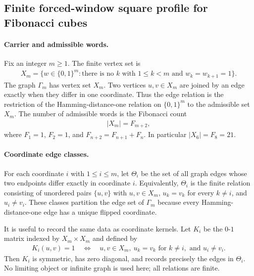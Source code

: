 
\subsection{Finite forced-window square profile for Fibonacci cubes}
\label{sec:window-fibonacci-cube-theta-square-factorization}

\paragraph{Carrier and admissible words.}
Fix an integer $m \geq 1$. The finite vertex set is
$$
\begin{aligned}
X_m=\{w\in \{0,1\}^m : \text{there is no }k\text{ with }1\leq k<m\text{ and }w_k=w_{k+1}=1\}.
\end{aligned}
$$
The graph $\Gamma_m$ has vertex set $X_m$. Two vertices $u,v\in X_m$ are joined by an edge exactly when they differ in one coordinate. Thus the edge relation is the restriction of the Hamming-distance-one relation on $\{0,1\}^m$ to the admissible set $X_m$. The number of admissible words is the Fibonacci count
$$
\begin{aligned}
|X_m|=F_{m+2},
\end{aligned}
$$
where $F_1=1$, $F_2=1$, and $F_{n+2}=F_{n+1}+F_n$. In particular $|X_6|=F_8=21$.

\paragraph{Coordinate edge classes.}
For each coordinate $i$ with $1\leq i\leq m$, let $\Theta_i$ be the set of all graph edges whose two endpoints differ exactly in coordinate $i$. Equivalently, $\Theta_i$ is the finite relation consisting of unordered pairs $\{u,v\}$ with $u,v\in X_m$, $u_k=v_k$ for every $k\neq i$, and $u_i\neq v_i$. These classes partition the edge set of $\Gamma_m$ because every Hamming-distance-one edge has a unique flipped coordinate.

It is useful to record the same data as coordinate kernels. Let $K_i$ be the $0$-$1$ matrix indexed by $X_m\times X_m$ and defined by
$$
\begin{aligned}
K_i(u,v)=1
\quad\Longleftrightarrow\quad
u,v\in X_m,\ u_k=v_k\text{ for }k\neq i,\text{ and }u_i\neq v_i.
\end{aligned}
$$
Then $K_i$ is symmetric, has zero diagonal, and records precisely the edges in $\Theta_i$. No limiting object or infinite graph is used here; all relations are finite.


